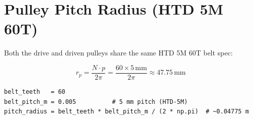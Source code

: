\documentclass[11pt, a4paper]{article}
\begin{document}
\section{Pulley Pitch Radius (HTD 5M 60T)}

Both the drive and driven pulleys share the same HTD 5M 60T belt spec:

\begin{equation}
  r_p = \frac{N \cdot p}{2\pi}
      = \frac{60 \times 5\,\text{mm}}{2\pi}
      \approx 47.75\,\text{mm}
  \label{eq:pitch-radius}
\end{equation}

\begin{lstlisting}
belt_teeth   = 60
belt_pitch_m = 0.005          # 5 mm pitch (HTD-5M)
pitch_radius = belt_teeth * belt_pitch_m / (2 * np.pi)  # ~0.04775 m
\end{lstlisting}
\end{document}
